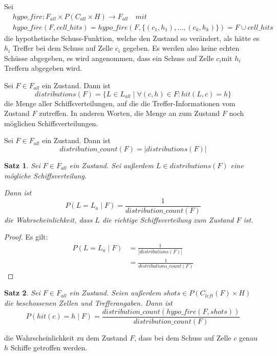 \documentclass[a4paper,12pt]{llncs}
\numberwithin{equation}{section}
\newtheorem{satz}{Satz}
\begin{document}
\begin{definition}
Sei
\begin{align}
&hypo\_fire:F_{all}\times P(C_{all}\times H) \rightarrow F_{all} \quad mit \nonumber\\
&hypo\_fire(F, cell\_hits)=hypo\_fire(F, \{(c_1,h_1), \dots, (c_k, h_k)\})=F \cup cell\_hits \nonumber
\end{align}
die hypothetische Schuss-Funktion, welche den Zustand so verändert, als hätte es $h_i$ Treffer bei dem Schuss auf Zelle $c_i$ gegeben. Es werden also keine echten Schüsse abgegeben, es wird angenommen, dass ein Schuss auf Zelle $c_i$mit $h_i$ Treffern abgegeben wird.
\end{definition}

\begin{definition}
Sei $F\in F_{all}$ ein Zustand.
Dann ist
\[
distributions(F)=\{L\in L_{all} \mid \forall (c,h) \in F \colon hit(L, c)=h\}
\]
die Menge aller Schiffsverteilungen, auf die die Treffer-Informationen vom Zustand $F$ zutreffen.
In anderen Worten, die Menge an zum Zustand $F$ noch möglichen Schiffsverteilungen.
\end{definition}

\begin{definition}
Sei $F\in F_{all}$ ein Zustand.
Dann ist
\[
distribution\_count(F)=|distributions(F)|
\]
\end{definition}


\begin{satz}
Sei $F\in F_{all}$ ein Zustand.
Sei außerdem $L \in distributions(F)$ eine mögliche Schiffsverteilung.

Dann ist
\[
P(L = L_a \mid F)=\frac{1}{distribution\_count(F)}
\]
die Wahrscheinlichkeit, dass $L$ die richtige Schiffsverteilung zum Zustand $F$ ist.
\end{satz}

\begin{proof}
Es gilt:
\begin{align}
P(L=L_a\mid F)&= \frac{1}{\left|distributions(F)\right|} \nonumber\\
 &= \frac{1}{distributions\_count(F)}\nonumber
\end{align}
\end{proof}


\begin{satz}
Sei $F\in F_{all}$ ein Zustand.
Seien außerdem $shots \in P(C_{left}(F) \times H)$ die beschossenen Zellen und Trefferangaben.
Dann ist
\[
P(hit(c)=h \mid F)=\frac{distribution\_count(hypo\_fire(F, shots))}{distribution\_count(F)}
\]
\end{satz}
die Wahrscheinlichkeit zu dem Zustand $F$, dass bei dem Schuss auf Zelle $c$ genau $h$ Schiffe getroffen werden.
\end{document}
